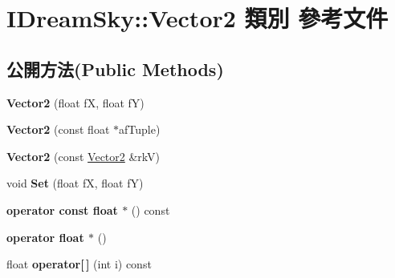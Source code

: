 \hypertarget{class_i_dream_sky_1_1_vector2}{}\section{I\+Dream\+Sky\+:\+:Vector2 類別 參考文件}
\label{class_i_dream_sky_1_1_vector2}
\subsection*{公開方法(Public Methods)}
\begin{DoxyCompactItemize}
\item 
{\bfseries Vector2} (float fX, float fY)\hypertarget{class_i_dream_sky_1_1_vector2_a14c06cf3a823a0454502d70bb5e553a1}{}\label{class_i_dream_sky_1_1_vector2_a14c06cf3a823a0454502d70bb5e553a1}

\item 
{\bfseries Vector2} (const float $\ast$af\+Tuple)\hypertarget{class_i_dream_sky_1_1_vector2_ad31e5c9ec90c5ed7aad6004a94bc6902}{}\label{class_i_dream_sky_1_1_vector2_ad31e5c9ec90c5ed7aad6004a94bc6902}

\item 
{\bfseries Vector2} (const \hyperlink{class_i_dream_sky_1_1_vector2}{Vector2} \&rkV)\hypertarget{class_i_dream_sky_1_1_vector2_ad16cc1e2626fdc0114e81abcc72e1c2a}{}\label{class_i_dream_sky_1_1_vector2_ad16cc1e2626fdc0114e81abcc72e1c2a}

\item 
void {\bfseries Set} (float fX, float fY)\hypertarget{class_i_dream_sky_1_1_vector2_abad6abbfba23ead573c61f85ec7c88eb}{}\label{class_i_dream_sky_1_1_vector2_abad6abbfba23ead573c61f85ec7c88eb}

\item 
{\bfseries operator const float $\ast$} () const \hypertarget{class_i_dream_sky_1_1_vector2_a28c64b39f3dec69361853211ad5f7271}{}\label{class_i_dream_sky_1_1_vector2_a28c64b39f3dec69361853211ad5f7271}

\item 
{\bfseries operator float $\ast$} ()\hypertarget{class_i_dream_sky_1_1_vector2_a12847f43bae78ff7c3385702a1d0bfde}{}\label{class_i_dream_sky_1_1_vector2_a12847f43bae78ff7c3385702a1d0bfde}

\item 
float {\bfseries operator\mbox{[}$\,$\mbox{]}} (int i) const \hypertarget{class_i_dream_sky_1_1_vector2_acec4c3e8c341035f5fdfa7b6abd4e9f9}{}\label{class_i_dream_sky_1_1_vector2_acec4c3e8c341035f5fdfa7b6abd4e9f9}


\end{DoxyCompactItemize}

